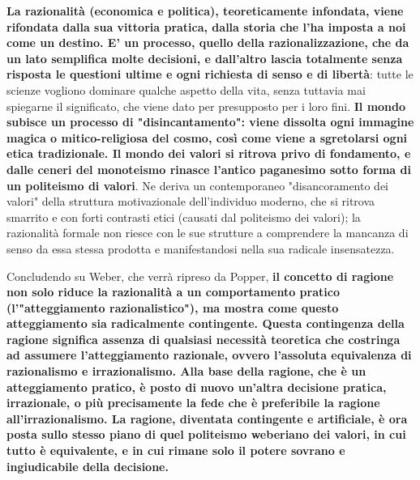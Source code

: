 \textbf{La razionalità (economica e politica),  teoreticamente infondata, viene rifondata dalla sua vittoria pratica, dalla storia che l'ha imposta a noi come un destino. E' un processo, quello della razionalizzazione, che da un lato semplifica molte decisioni, e dall'altro lascia totalmente senza risposta le questioni ultime e ogni richiesta di senso e di libertà}: tutte le scienze vogliono dominare qualche aspetto della vita, senza tuttavia mai spiegarne il significato, che viene dato per presupposto per i loro fini. \textbf{Il mondo subisce un processo di "disincantamento": viene  dissolta ogni immagine magica o mitico-religiosa del cosmo, così come viene a sgretolarsi ogni etica tradizionale. Il mondo dei valori si ritrova privo di fondamento, e dalle ceneri del monoteismo rinasce  l'antico paganesimo sotto forma di un politeismo di valori}. Ne deriva un contemporaneo "disancoramento dei valori" della struttura motivazionale dell'individuo moderno, che si ritrova smarrito e con forti contrasti etici (causati dal politeismo dei valori); la razionalità formale non riesce con le sue strutture a comprendere la mancanza di senso da essa stessa prodotta e manifestandosi  nella sua radicale insensatezza.

Concludendo su Weber, che verrà ripreso da Popper, \textbf{il concetto di ragione non solo riduce la razionalità a un comportamento pratico (l'"atteggiamento razionalistico"), ma mostra come questo atteggiamento sia radicalmente contingente. Questa contingenza della ragione significa assenza di qualsiasi necessità teoretica che costringa  ad assumere l'atteggiamento razionale, ovvero l'assoluta equivalenza di razionalismo e irrazionalismo. Alla base della ragione, che è un atteggiamento pratico, è posto di nuovo un'altra decisione pratica, irrazionale, o più precisamente la fede che è preferibile la ragione all'irrazionalismo. La ragione, diventata contingente e artificiale, è ora posta sullo stesso piano di quel politeismo weberiano dei valori, in cui tutto è equivalente, e in cui rimane solo il potere sovrano e ingiudicabile della decisione.}

